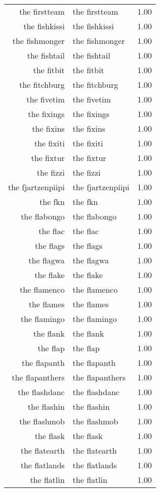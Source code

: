 \begin{table}[ht]
\begin{tabular}{rlr}
  the firstteam & the firstteam & 1.00 \\ 
  the fishkissi & the fishkissi & 1.00 \\ 
  the fishmonger & the fishmonger & 1.00 \\ 
  the fishtail & the fishtail & 1.00 \\ 
  the fitbit & the fitbit & 1.00 \\ 
  the fitchburg & the fitchburg & 1.00 \\ 
  the fivetim & the fivetim & 1.00 \\ 
  the fixings & the fixings & 1.00 \\ 
  the fixins & the fixins & 1.00 \\ 
  the fixiti & the fixiti & 1.00 \\ 
  the fixtur & the fixtur & 1.00 \\ 
  the fizzi & the fizzi & 1.00 \\ 
  the fjartzenpiipi & the fjartzenpiipi & 1.00 \\ 
  the fkn & the fkn & 1.00 \\ 
  the flabongo & the flabongo & 1.00 \\ 
  the flac & the flac & 1.00 \\ 
  the flags & the flags & 1.00 \\ 
  the flagwa & the flagwa & 1.00 \\ 
  the flake & the flake & 1.00 \\ 
  the flamenco & the flamenco & 1.00 \\ 
  the flames & the flames & 1.00 \\ 
  the flamingo & the flamingo & 1.00 \\ 
  the flank & the flank & 1.00 \\ 
  the flap & the flap & 1.00 \\ 
  the flapanth & the flapanth & 1.00 \\ 
  the flapanthers & the flapanthers & 1.00 \\ 
  the flashdanc & the flashdanc & 1.00 \\ 
  the flashin & the flashin & 1.00 \\ 
  the flashmob & the flashmob & 1.00 \\ 
  the flask & the flask & 1.00 \\ 
  the flatearth & the flatearth & 1.00 \\ 
  the flatlands & the flatlands & 1.00 \\ 
  the flatlin & the flatlin & 1.00 \\ 

\end{tabular}
\end{table}
